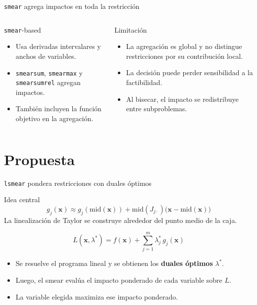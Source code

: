 \documentclass[10pt,aspectratio=169]{beamer}
\begin{document}
\begin{frame}{\texttt{smear} agrega impactos en toda la restricción}
\small
\begin{columns}[T]
\begin{block}{\texttt{smear}-based}
\begin{itemize}
  \item Usa derivadas intervalares y anchos de variables.
  \item \texttt{smearsum}, \texttt{smearmax} y \texttt{smearsumrel} agregan impactos.
  \item También incluyen la función objetivo en la agregación.
\end{itemize}
\end{block}

\begin{alertblock}{Limitación}
\begin{itemize}
  \item La agregación es global y no distingue restricciones por su contribución local.
  \item La decisión puede perder sensibilidad a la factibilidad.
  \item Al bisecar, el impacto se redistribuye entre subproblemas.
\end{itemize}
\end{alertblock}
\end{columns}

\end{frame}

\section{Propuesta}

\begin{frame}{\texttt{lsmear} pondera restricciones con duales óptimos}
\small
\begin{block}{Idea central}
\begin{equation*}
g_j(\mathbf{x}) \approx g_j(\mathrm{mid}(\mathbf{x})) + \mathrm{mid}(J_{j\cdot})\bigl(\mathbf{x}-\mathrm{mid}(\mathbf{x})\bigr)
\end{equation*}
La linealización de Taylor se construye alrededor del punto medio de la caja.
\end{block}

\begin{equation*}
L(\mathbf{x},\lambda^*) = f(\mathbf{x}) + \sum_{j=1}^{m}\lambda_j^*\, g_j(\mathbf{x})
\end{equation*}
\begin{itemize}
  \item Se resuelve el programa lineal y se obtienen los \textbf{duales óptimos} \(\lambda^*\).
  \item Luego, el smear evalúa el impacto ponderado de cada variable sobre \(L\).
  \item \alert{La variable elegida maximiza ese impacto ponderado.}
\end{itemize}
\end{frame}
\end{document}
